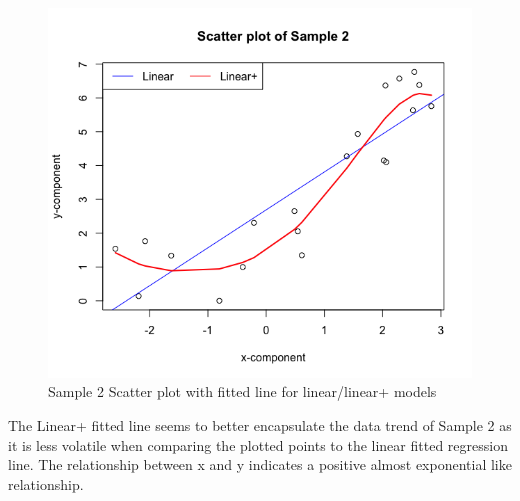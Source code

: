 \documentclass{article}
\begin{document}
\begin{figure}[!htb]
\caption{Sample 2 Scatter plot with fitted line for linear/linear+ models}
\label{returns_microsoft}
\begin{center}
\includegraphics[scale=0.8]{sample2.png}
\end{center}
\end{figure}
The Linear+ fitted line seems to better encapsulate the data trend of Sample 2 as it is less volatile when comparing the plotted points to the linear fitted regression line. The relationship between x and y indicates a positive almost exponential like relationship.
\newpage
\end{document}
